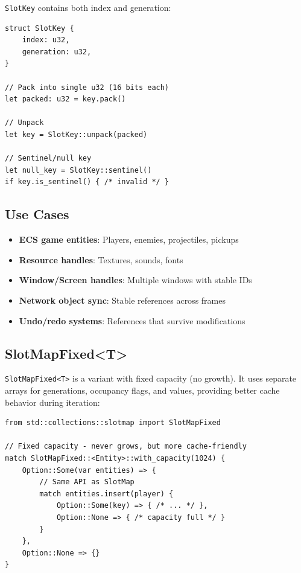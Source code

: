 \texttt{SlotKey} contains both index and generation:

\begin{lstlisting}
struct SlotKey {
    index: u32,
    generation: u32,
}

// Pack into single u32 (16 bits each)
let packed: u32 = key.pack()

// Unpack
let key = SlotKey::unpack(packed)

// Sentinel/null key
let null_key = SlotKey::sentinel()
if key.is_sentinel() { /* invalid */ }
\end{lstlisting}

\subsection{Use Cases}

\begin{itemize}
    \item \textbf{ECS game entities}: Players, enemies, projectiles, pickups
    \item \textbf{Resource handles}: Textures, sounds, fonts
    \item \textbf{Window/Screen handles}: Multiple windows with stable IDs
    \item \textbf{Network object sync}: Stable references across frames
    \item \textbf{Undo/redo systems}: References that survive modifications
\end{itemize}

\subsection{SlotMapFixed<T>}

\texttt{SlotMapFixed<T>} is a variant with fixed capacity (no growth). It uses separate arrays for generations, occupancy flags, and values, providing better cache behavior during iteration:

\begin{lstlisting}
from std::collections::slotmap import SlotMapFixed

// Fixed capacity - never grows, but more cache-friendly
match SlotMapFixed::<Entity>::with_capacity(1024) {
    Option::Some(var entities) => {
        // Same API as SlotMap
        match entities.insert(player) {
            Option::Some(key) => { /* ... */ },
            Option::None => { /* capacity full */ }
        }
    },
    Option::None => {}
}
\end{lstlisting}


